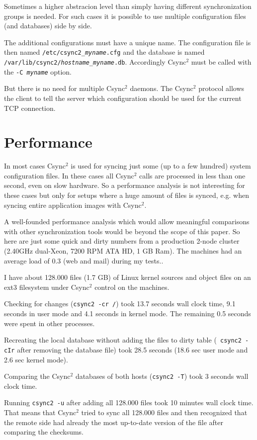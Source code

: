 \documentclass[a4paper,twocolumn]{article}
\def\csync2{{\sc Csync$^{2}$}}
\begin{document}
Sometimes a higher abstracion level than simply having different
synchronization groups is needed. For such cases it is possible to use multiple
configuration files (and databases) side by side.

The additional configurations must have a unique name. The configuration file
is then named {\tt /etc/csync2\_{\it myname}.cfg} and the database is named
{\tt /var/lib/csync2/{\it hostname}\_{\it myname}.db}. Accordingly \csync2 must
be called with the {\tt -C {\it myname}} option.

But there is no need for multiple \csync2 daemons. The \csync2 protocol allows
the client to tell the server which configuration should be used for the
current TCP connection.

\section{Performance}

In most cases \csync2 is used for syncing just some (up to a few hundred) system
configuration files. In these cases all \csync2 calls are processed in less than
one second, even on slow hardware. So a performance analysis is not interesting
for these cases but only for setups where a huge amount of files is synced,
e.g. when syncing entire application images with \csync2.

A well-founded performance analysis which would allow meaningful comparisons
with other synchronization tools would be beyond the scope of this paper.
So here are just some quick and dirty numbers from a production
2-node cluster (2.40GHz dual-Xeon, 7200 RPM ATA HD, 1 GB Ram). The machines
had an average load of 0.3 (web and mail) during my tests..

I have about 128.000 files (1.7 GB) of Linux kernel sources and object
files on an ext3 filesystem under \csync2 control on the machines.

Checking for changes ({\tt csync2 -cr /}) took 13.7 seconds wall clock time,
9.1 seconds in user mode and 4.1 seconds in kernel mode. The remaining 0.5
seconds were spent in other processes.

Recreating the local database without adding the files to dirty table ({\tt
csync2 -cIr} after removing the database file) took 28.5 seconds (18.6 sec
user mode and 2.6 sec kernel mode). 

Comparing the \csync2 databases of both hosts ({\tt csync2 -T}) took 3 seconds
wall clock time.

Running {\tt csync2 -u} after adding all 128.000 files took 10 minutes wall
clock time. That means that \csync2 tried to sync all 128.000 files and then
recognized that the remote side had already the most up-to-date version of
the file after comparing the checksums.
\end{document}
